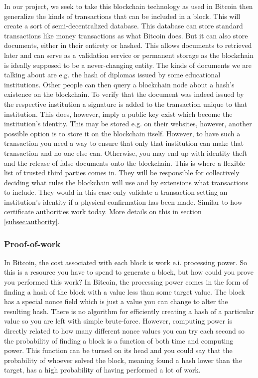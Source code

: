 \documentclass[11pt]{article}
\begin{document}
In our project, we seek to take this blockchain technology as used in Bitcoin then generalize the kinds of transactions that can be included in a block. This will create a sort of semi-decentralized database. This database can store standard transactions like money transactions as what Bitcoin does. But it can also store documents, either in their entirety or hashed. This allows documents to retrieved later and can serve as a validation service or permanent storage as the blockchain is ideally supposed to be a never-changing entity. The kinds of documents we are talking about are e.g. the hash of diplomas issued by some educational institutions. Other people can then query a blockchain node about a hash's existence on the blockchain. To verify that the document was indeed issued by the respective institution a signature is added to the transaction unique to that institution. This does, however, imply a public key exist which become the institution's identity. This may be stored e.g. on their websites, however, another possible option is to store it on the blockchain itself. However, to have such a transaction you need a way to ensure that only that institution can make that transaction and no one else can. Otherwise, you may end up with identity theft and the release of false documents onto the blockchain. This is where a flexible list of trusted third parties comes in. They will be responsible for collectively deciding what rules the blockchain will use and by extensions what transactions to include. They would in this case only validate a transaction setting an institution's identity if a physical confirmation has been made. Similar to how certificate authorities work today. More details on this in section \ref{subsec:authority}.


\subsubsection{Proof-of-work}\label{subsubsec:proofofwork}
In Bitcoin, the cost associated with each block is work e.i. processing power. So this is a resource you have to spend to generate a block, but how could you prove you performed this work? In Bitcoin, the processing power comes in the form of finding a hash of the block with a value less than some target value. The block has a special nonce field which is just a value you can change to alter the resulting hash. There is no algorithm for efficiently creating a hash of a particular value so you are left with simple brute-force. However, computing power is directly related to how many different nonce values you can try each second so the probability of finding a block is a function of both time and computing power. This function can be turned on its head and you could say that the probability of whoever solved the block, meaning found a hash lower than the target, has a high probability of having performed a lot of work.
\end{document}
